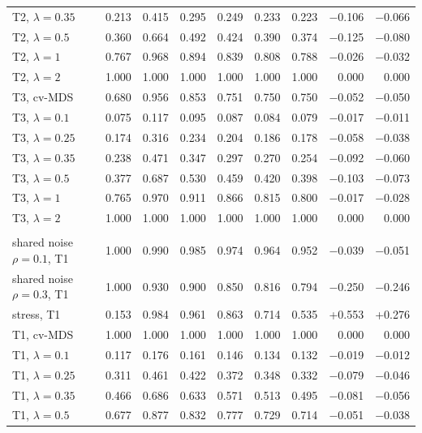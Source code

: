 \documentclass[11pt]{article}
\begin{document}
\begin{table}[!htb]
\begin{tabular}{lrrrrrrrr}
\quad T2, $\lambda=0.35$ & 0.213 & 0.415 & 0.295 & 0.249 & 0.233 & 0.223 & $-$0.106 & $-$0.066 \\
\quad T2, $\lambda=0.5$ & 0.360 & 0.664 & 0.492 & 0.424 & 0.390 & 0.374 & $-$0.125 & $-$0.080 \\
\quad T2, $\lambda=1$ & 0.767 & 0.968 & 0.894 & 0.839 & 0.808 & 0.788 & $-$0.026 & $-$0.032 \\
\quad T2, $\lambda=2$ & 1.000 & 1.000 & 1.000 & 1.000 & 1.000 & 1.000 & 0.000 & 0.000 \\
\quad T3, cv-MDS & 0.680 & 0.956 & 0.853 & 0.751 & 0.750 & 0.750 & $-$0.052 & $-$0.050 \\
\quad T3, $\lambda=0.1$ & 0.075 & 0.117 & 0.095 & 0.087 & 0.084 & 0.079 & $-$0.017 & $-$0.011 \\
\quad T3, $\lambda=0.25$ & 0.174 & 0.316 & 0.234 & 0.204 & 0.186 & 0.178 & $-$0.058 & $-$0.038 \\
\quad T3, $\lambda=0.35$ & 0.238 & 0.471 & 0.347 & 0.297 & 0.270 & 0.254 & $-$0.092 & $-$0.060 \\
\quad T3, $\lambda=0.5$ & 0.377 & 0.687 & 0.530 & 0.459 & 0.420 & 0.398 & $-$0.103 & $-$0.073 \\
\quad T3, $\lambda=1$ & 0.765 & 0.970 & 0.911 & 0.866 & 0.815 & 0.800 & $-$0.017 & $-$0.028 \\
\quad T3, $\lambda=2$ & 1.000 & 1.000 & 1.000 & 1.000 & 1.000 & 1.000 & 0.000 & 0.000 \\
\addlinespace
\multicolumn{9}{l}{\textit{Mouse V1}: $R_h$ = 8, 12, 24, 48, 96} \\
\quad shared noise $\rho=0.1$, T1 & 1.000 & 0.990 & 0.985 & 0.974 & 0.964 & 0.952 & $-$0.039 & $-$0.051 \\
\quad shared noise $\rho=0.3$, T1 & 1.000 & 0.930 & 0.900 & 0.850 & 0.816 & 0.794 & $-$0.250 & $-$0.246 \\
\quad stress, T1 & 0.153 & 0.984 & 0.961 & 0.863 & 0.714 & 0.535 & +0.553 & +0.276 \\
\quad T1, cv-MDS & 1.000 & 1.000 & 1.000 & 1.000 & 1.000 & 1.000 & 0.000 & 0.000 \\
\quad T1, $\lambda=0.1$ & 0.117 & 0.176 & 0.161 & 0.146 & 0.134 & 0.132 & $-$0.019 & $-$0.012 \\
\quad T1, $\lambda=0.25$ & 0.311 & 0.461 & 0.422 & 0.372 & 0.348 & 0.332 & $-$0.079 & $-$0.046 \\
\quad T1, $\lambda=0.35$ & 0.466 & 0.686 & 0.633 & 0.571 & 0.513 & 0.495 & $-$0.081 & $-$0.056 \\
\quad T1, $\lambda=0.5$ & 0.677 & 0.877 & 0.832 & 0.777 & 0.729 & 0.714 & $-$0.051 & $-$0.038 \\

\end{tabular}
\end{table}
\end{document}
